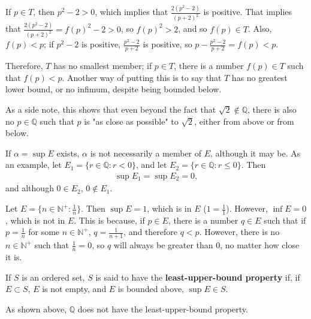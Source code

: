 \documentclass[12pt]{article}
\begin{document}
\begin{exm}
  If $p \in T$, then $p^2 - 2 > 0$, which implies that $\frac{2(p^2 - 2)}{(p + 2)^2}$
  is positive. That implies that $\frac{2(p^2 - 2)}{(p + 2)^2} = f(p)^2 - 2 > 0$, so
  $f(p)^2 > 2$, and so $f(p) \in T$. Also, $f(p) < p$; if $p^2 - 2$ is positive,
  $\frac{p^2 - 2}{p + 2}$ is positive, so $p - \frac{p^2 - 2}{p + 2} = f(p) < p$.

  Therefore, $T$ has no smallest member; if $p \in T$, there is a number $f(p) \in T$
  such that $f(p) < p$. Another way of putting this is to say that $T$ has no
  greatest lower bound, or no infimum, despite being bounded below.

  As a side note, this shows that even beyond the fact that $\sqrt{2} \notin
  \mathbb{Q}$, there is also no $p \in \mathbb{Q}$ such that $p$ is "as close as
  possible" to $\sqrt{2}$, either from above or from below.
\end{exm}

\begin{exm}
  If $\alpha = \sup E$ exists, $\alpha$ is not necessarily a member of $E$, although
  it may be. As an example, let $E_1 = \{r \in \mathbb{Q}: r < 0\}$, and let $E_2 =
  \{r \in \mathbb{Q}: r \leq 0\}$. Then
  \begin{align*}
    \sup E_1 = \sup E_2 = 0,
  \end{align*}
  and although $0 \in E_2$, $0 \notin E_1$.
\end{exm}

\begin{exm}
  Let $E = \{n \in \mathbb{N}^+: \frac{1}{n}\}$. Then $\sup E = 1$, which is in $E$
  ($1 = \frac{1}{1}$).  However, $\inf E = 0$, which is not in $E$. This is because,
  if $p \in E$, there is a number $q \in E$ such that if $p = \frac{1}{n}$ for some
  $n \in \mathbb{N}^+$, $q = \frac{1}{n + 1}$, and therefore $q < p$. However, there
  is no $n \in \mathbb{N}^+$ such that $\frac{1}{n} = 0$, so $q$ will always be
  greater than $0$, no matter how close it is.
\end{exm}

\begin{defn}
  If $S$ is an ordered set, $S$ is said to have the \textbf{least-upper-bound
  property} if, if $E \subset S$, $E$ is not empty, and $E$ is bounded above, $\sup E
  \in S$.
\end{defn}

\begin{exm}
  As shown above, $\mathbb{Q}$ does not have the least-upper-bound property.
\end{exm}
\end{document}

